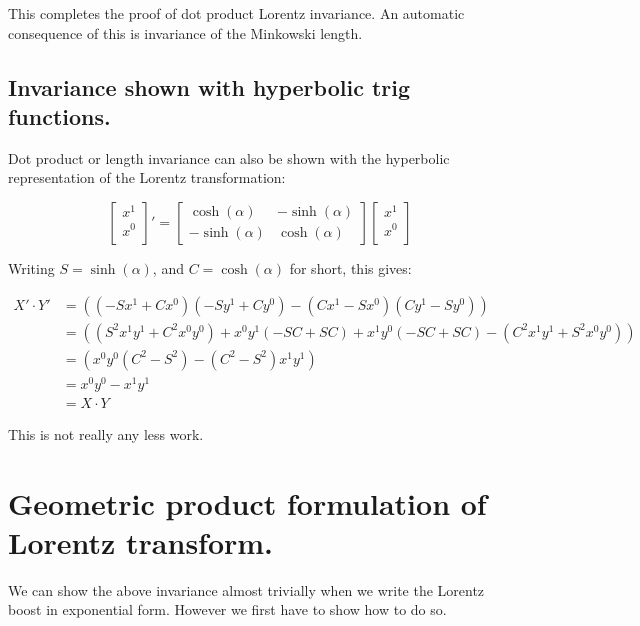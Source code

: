 \documentclass{article}      %
\begin{document}
This completes the proof of dot product Lorentz invariance.  An automatic consequence of this is invariance
of the Minkowski length.

\subsection{ Invariance shown with hyperbolic trig functions. }

Dot product or length invariance can also be shown with the hyperbolic representation of the Lorentz transformation:

\begin{equation}\label{eqn:hyperbolicmatrix}
{
\begin{bmatrix}
x^1 \\
x^0 \\
\end{bmatrix}
}'
=
\begin{bmatrix}
\cosh(\alpha) & -\sinh(\alpha) \\
-\sinh(\alpha) & \cosh(\alpha)
\end{bmatrix}
\begin{bmatrix}
x^1 \\
x^0 \\
\end{bmatrix}
\end{equation}

Writing $S=\sinh(\alpha)$, and $C=\cosh(\alpha)$ for short, this gives:

\begin{align*}
X' \cdot Y' 
&= \left( (-S x^1 + C x^0)(-S y^1 + C y^0) -(C x^1 -S x^0) (C y^1 -S y^0) \right) \\
&= \left( (S^2  x^1 y^1 + C^2  x^0 y^0) + x^0 y^1( -SC + SC ) + x^1 y^0( -SC + SC ) -(C^2  x^1 y^1 + S^2  x^0 y^0) \right) \\
&= \left( x^0 y^0 (C^2  -S^2 ) - (C^2 -S^2 ) x^1 y^1 \right) \\
&= x^0 y^0 - x^1 y^1 \\
&= X \cdot Y
\end{align*}

This is not really any less work.

\section{ Geometric product formulation of Lorentz transform. }

We can show the above invariance almost trivially when we write the Lorentz boost in exponential form.  However we first have to show
how to do so.
\end{document}
